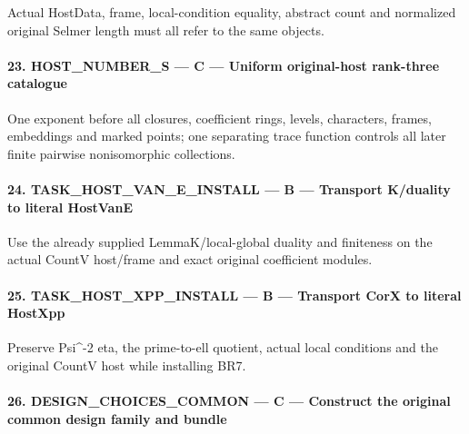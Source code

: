 Actual HostData, frame, local-condition equality, abstract count and normalized original Selmer length must all refer to the same objects.


\paragraph{23. HOST\_\allowbreak{}NUMBER\_\allowbreak{}S — C — Uniform original-host rank-three catalogue}

One exponent before all closures, coefficient rings, levels, characters, frames, embeddings and marked points; one separating trace function controls all later finite pairwise nonisomorphic collections.


\paragraph{24. TASK\_\allowbreak{}HOST\_\allowbreak{}VAN\_\allowbreak{}E\_\allowbreak{}INSTALL — B — Transport K/\allowbreak{}duality to literal HostVanE}

Use the already supplied LemmaK/\allowbreak{}local-global duality and finiteness on the actual CountV host/\allowbreak{}frame and exact original coefficient modules.


\paragraph{25. TASK\_\allowbreak{}HOST\_\allowbreak{}XPP\_\allowbreak{}INSTALL — B — Transport CorX to literal HostXpp}

Preserve Psi\textasciicircum{}-2 eta, the prime-to-ell quotient, actual local conditions and the original CountV host while installing BR7.


\paragraph{26. DESIGN\_\allowbreak{}CHOICES\_\allowbreak{}COMMON — C — Construct the original common design family and bundle}


